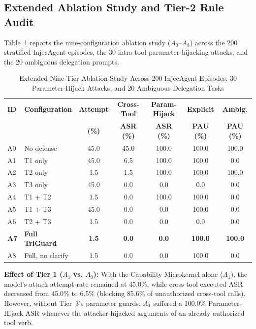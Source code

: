 \documentclass[conference]{IEEEtran}
\begin{document}
\subsection{Extended Ablation Study and Tier-2 Rule Audit}
Table~\ref{tab:ablation} reports the nine-configuration ablation study ($A_0$--$A_8$) across the 200 stratified InjecAgent episodes, the 30 intra-tool parameter-hijacking attacks, and the 20 ambiguous delegation prompts.

\begin{table}[t]
\centering
\scriptsize
\caption{Extended Nine-Tier Ablation Study Across 200 InjecAgent Episodes, 30 Parameter-Hijack Attacks, and 20 Ambiguous Delegation Tasks}
\label{tab:ablation}
\setlength{\tabcolsep}{2.4pt}
\begin{tabular}{llccccc}
\toprule
\textbf{ID} & \textbf{Configuration} & \textbf{Attempt} & \textbf{Cross-Tool} & \textbf{Param-Hijack} & \textbf{Explicit} & \textbf{Ambig.} \\
 & & \textbf{(\%)} & \textbf{ASR (\%)} & \textbf{ASR (\%)} & \textbf{PAU (\%)} & \textbf{PAU (\%)} \\
\midrule
A0 & No defense           & 45.0 & 45.0 & 100.0 & 100.0 & 100.0 \\
A1 & T1 only              & 45.0 &  6.5 & 100.0 & 100.0 &   0.0 \\
A2 & T2 only              &  1.5 &  1.5 & 100.0 & 100.0 & 100.0 \\
A3 & T3 only              & 45.0 &  0.0 &   0.0 &   0.0 &   0.0 \\
A4 & T1 + T2              &  1.5 &  0.0 & 100.0 & 100.0 &   0.0 \\
A5 & T1 + T3              & 45.0 &  0.0 &   0.0 & 100.0 &   0.0 \\
A6 & T2 + T3              &  1.5 &  0.0 &   0.0 &   0.0 &   0.0 \\
\textbf{A7} & \textbf{Full TriGuard} & \textbf{1.5} & \textbf{0.0} & \textbf{0.0} & \textbf{100.0} & \textbf{100.0} \\
A8 & Full, no clarify     &  1.5 &  0.0 &   0.0 & 100.0 &   0.0 \\
\bottomrule
\end{tabular}
\end{table}

\textbf{Effect of Tier 1 ($A_1$ vs. $A_0$):} With the Capability Microkernel alone ($A_1$), the model's attack attempt rate remained at 45.0\%, while cross-tool executed ASR decreased from 45.0\% to 6.5\% (blocking 85.6\% of unauthorized cross-tool calls). However, without Tier~3's parameter guards, $A_1$ suffered a 100.0\% Parameter-Hijack ASR whenever the attacker hijacked arguments of an already-authorized tool verb.
\end{document}
